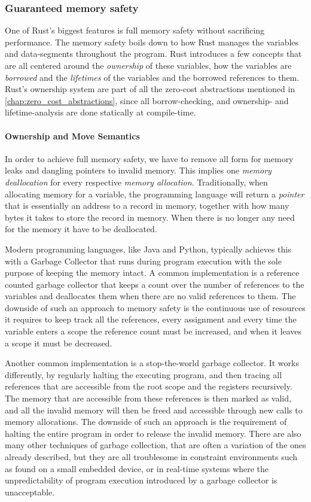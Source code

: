\subsubsection{Guaranteed memory safety}

One of Rust's biggest features is full memory safety \cite{web:rust_book_unsafe} without sacrificing
performance. The memory safety boils down to how Rust manages the variables and data-segments
throughout the program. Rust introduces a few concepts that are all centered around the
\emph{ownership} of these variables, how the variables are \emph{borrowed} and the \emph{lifetimes}
of the variables and the borrowed references to them. Rust's ownership system are part of all the
zero-cost abstractions mentioned in \autoref{chap:zero_cost_abstractions}, since all borrow-checking,
and ownership- and lifetime-analysis are done statically at compile-time.

\paragraph{Ownership and Move Semantics} \hfill

In order to achieve full memory safety, we have to remove all form for memory leaks and dangling
pointers to invalid memory. This implies one \emph{memory deallocation} for every respective
\emph{memory allocation}. Traditionally, when allocating memory for a variable, the programming
language will return a \emph{pointer} that is essentially an address to a record in memory,
together with how many bytes it takes to store the record in memory. When there is no longer any
need for the memory it have to be deallocated.

Modern programming languages, like Java and Python, typically achieves this with a Garbage Collector
that runs during program execution with the sole purpose of keeping the memory intact. A common
implementation is a reference counted garbage collector that keeps a count over the number of
references to the variables and deallocates them when there are no valid references to them. The
downside of such an approach to memory safety is the continuous use of resources it requires to keep
track all the references, every assignment and every time the variable enters a scope the reference
count must be increased, and when it leaves a scope it must be decreased.

Another common implementation is a stop-the-world garbage collector. It works differently, by
regularly halting the executing program, and then tracing all references that are accessible from
the root scope and the registers recursively. The memory that are accessible from these references
is then marked as valid, and all the invalid memory will then be freed and accessible through new
calls to memory allocations. The downside of such an approach is the requirement of halting the
entire program in order to release the invalid memory. There are also many other techniques of
garbage collection, that are often a variation of the ones already described, but they are all
troublesome in constraint environments such as found on a small embedded device, or in real-time
systems where the unpredictability of program execution introduced by a garbage collector is
unacceptable.

